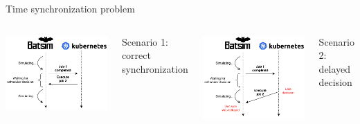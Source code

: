 \documentclass[12pt, aspectratio=43]{beamer}
\begin{document}
\begin{frame}{Time synchronization problem}
	\begin{columns}
		\includegraphics[scale=0.65]{../imgs/time-sync-correct.pdf}

		\small{Scenario 1: correct synchronization}

		\includegraphics[scale=0.6]{../imgs/time-sync-delayed.pdf}

		\small{Scenario 2: delayed decision}
	\end{columns}
\end{frame}
\end{document}
